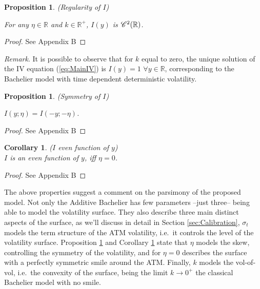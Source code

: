 \documentclass[12pt]{article}
\newtheorem{proposition}[theorem]{Proposition}
\newtheorem{corollary}[theorem]{Corollary}
\theoremstyle{definition}
\theoremstyle{remark}
\numberwithin{theorem}{section}
\numberwithin{proposition}{section}
\numberwithin{lemma}{section}
\numberwithin{corollary}{section}
\numberwithin{definition}{section}
\numberwithin{remark}{section}
\numberwithin{example}{section}
\newcommand{\R}{\mathbb{R}}
\begin{document}
\begin{proposition} {\rm  (Regularity of ${ I}
$)}

For any $\eta\in\R$ and $ k \in \R^+$,  ${ I}({ y})$ is ${\cal C}^2 ( \R)$.
\label{pr:Regularity}
\end{proposition}
\begin{proof}
    See Appendix B
\end{proof}

{\it Remark}.
It is possible to observe that for $k$ equal to zero, the unique solution of the IV equation (\ref{eq:MainIV}) is ${ I}({ y}) = 1$ $\forall { y} \in \R$, corresponding to the Bachelier model with time dependent deterministic volatility.


\begin{proposition} {\rm (Symmetry of ${ I}
$) }
\label{pr:Symmetry}

 ${ I}({ y}; \eta) = { I}(-{ y}; -\eta) $.
\end{proposition}
\begin{proof}
    See Appendix B
\end{proof}

\begin{corollary} {\rm (${ I}$  even function of ${ y}$) }\\
 ${ I}$  is an even function of ${ y}$, iff $\eta=0$.
\label{cor:Symmetry}
\end{corollary}
\begin{proof}
    See Appendix B
\end{proof}

\smallskip

The above properties suggest a comment on the parsimony of the proposed model.
Not only the Additive Bachelier has few parameters --just three-- being able to model the volatility surface.
They also describe three main distinct aspects of the surface, as we'll discuss in detail in Section \ref{sec:Calibration}, $\sigma_t$ models the term structure of the ATM volatility, i.e.\ it controls the level of the volatility surface.
Proposition \ref{pr:Symmetry} and Corollary \ref{cor:Symmetry} state that $\eta$ models the skew, controlling the symmetry of the volatility, and for $\eta=0$ describes the surface with a perfectly symmetric smile around the ATM.
Finally, $k$ models the vol-of-vol, i.e.\ the convexity of the surface, being the limit $k \to 0^+$ the classical Bachelier model with no smile.

\bigskip
\end{document}
